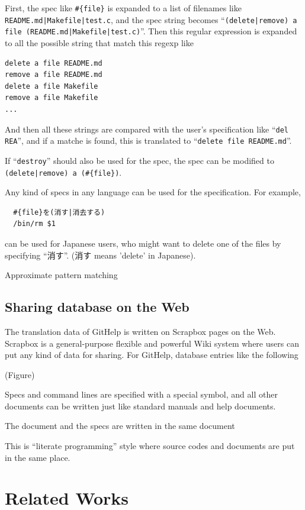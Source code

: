 \documentclass{sigchi}
\def\GH{\textsf{GitHelp}}
\def\SB{\textsf{Scrapbox}}
\begin{document}
First, the spec like \verb|#{file}| is expanded to a list of filenames like
\verb+README.md|Makefile|test.c+,
and the spec string becomes
``\verb+(delete|remove) a file (README.md|Makefile|test.c)+''.
Then this regular expression is expanded to all the possible string that match this regexp like
\begin{verbatim}
delete a file README.md
remove a file README.md
delete a file Makefile
remove a file Makefile
...
\end{verbatim}

And then all these strings are compared with the user's specification like
``\verb|del REA|'',
and if a matche is found,
this is translated to
``\verb|delete file README.md|''.

If ``\verb|destroy|'' should also be used for the spec,
the spec can be modified to 
\verb+(delete|remove) a (#{file})+.

Any kind of specs in any language can be used for the specification.
For example,

\begin{verbatim}
  #{file}を(消す|消去する)
  /bin/rm $1
\end{verbatim}

can be  used for Japanese users, who might want to delete
one of the files by specifying ``消す''.
(消す means 'delete' in Japanese).


Approximate pattern matching


\subsection{Sharing database on the Web}

The translation data of {\GH} is written on {\SB} pages on the Web.
{\SB} is a general-purpose flexible and powerful Wiki system where
users can put any kind of data for sharing.
For {\GH}, database entries like the following

(Figure)

Specs and command lines are specified with a special symbol, and
all other documents can be written just like standard manuals and help documents.

The document and the specs are written in the same document

This is
``literate programming'' style where
source codes and documents are put in the same place.

\section{Related Works}
\end{document}
